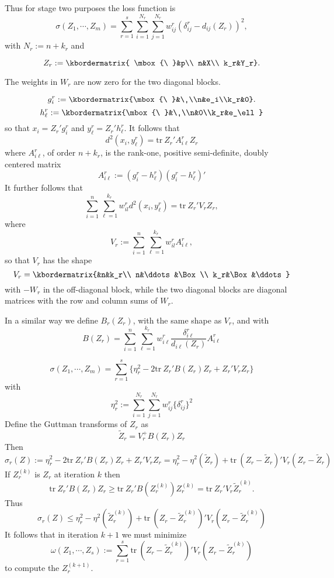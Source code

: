 \documentclass[
  12pt,
]{article}
\begin{document}
Thus for stage two purposes the loss function is
\[
\sigma(Z_1,\cdots,Z_m)=\sum_{r=1}^s\sum_{i=1}^{N_r}\sum_{j=1}^{N_r}w_{ij}^r(\delta_{ij}^r-d_{ij}(Z_r))^2,
\]
with \(N_r:=n+k_r\) and

\[
Z_r:=\kbordermatrix{
\mbox{\ }&p\\
n&X\\
k_r&Y_r}.
\]

The weights in \(W_r\) are now zero for the two diagonal blocks.

\[
g_i^r:=\kbordermatrix{\mbox{\ }&\ \\n&e_i\\k_r&0}.
\]
\[
h_\ell^r:=\kbordermatrix{\mbox{\ }&\ \\n&0\\k_r&e_\ell}
\]
so that \(x_i=Z_r'g_i^r\) and \(y_\ell^r=Z_r'h_\ell^r\). It follows that
\[
d^2(x_i,y_\ell^r)=\text{tr}\ Z_r'A^r_{i\ell}Z_r^{\ }
\]
where \(A_{i\ell}^r\), of order \(n+k_r\), is the rank-one, positive semi-definite, doubly centered matrix
\[
A_{i\ell}^r:=(g_i^r-h_\ell^r)(g_i^r-h_\ell^r)'
\]
It further follows that
\[
\sum_{i=1}^n\sum_{\ell=1}^{k_r}w_{il}^rd^2(x_i,y_\ell^r)=\text{tr}\ Z_r'V_rZ_r,
\]
where
\[
V_r:=\sum_{i=1}^n\sum_{\ell=1}^{k_r}w_{il}^rA^r_{i\ell},
\]
so that \(V_r\) has the shape
\[
V_r=\kbordermatrix{&n&k_r\\
n&\ddots&\Box\\
k_r&\Box&\ddots}
\]
with \(-W_r\) in the off-diagonal block, while the two diagonal
blocks are diagonal matrices with the row and column sums of \(W_r\).

In a similar way we define \(B_r(Z_r)\), with the same shape as \(V_r\), and with
\[
B(Z_r)=\sum_{i=1}^n\sum_{\ell=1}^{k_r}w_{i\ell}^r\frac{\delta_{i\ell}^r }{d_{i\ell}(Z_r)}A^r_{i\ell}
\]

\[
\sigma(Z_1,\cdots,Z_m)=\sum_{r=1}^s\{\eta_r^2-2\text{tr}\ Z_r'B(Z_r)Z_r+Z_r'V_rZ_r\}
\]
with
\[
\eta_r^2:=\sum_{i=1}^{N_r}\sum_{j=1}^{N_r}w_{ij}^r\{\delta_{ij}^r\}^2
\]
Define the Guttman transforms of \(Z_r\) as
\[
\tilde Z_r=V_r^+B(Z_r)Z_r
\]
Then
\[
\sigma_r(Z):=\eta_r^2-2\text{tr}\ Z_r'B(Z_r)Z_r+Z_r'V_rZ_r=\eta_r^2-\eta^2(\tilde Z_r)+\text{tr}\ (Z_r-\tilde Z_r)'V_r(Z_r-\tilde Z_r)
\]
If \(Z_r^{(k)}\) is \(Z_r\) at iteration \(k\) then
\[
\text{tr}\ Z_r'B(Z_r)Z_r\geq\text{tr}\ Z_r'B(Z_r^{(k)})Z_r^{(k)}=\text{tr}\ Z_r'V_r\tilde Z_r^{(k)}.
\]
Thus
\[
\sigma_r(Z)\leq\eta_r^2-\eta^2(\tilde Z_r^{(k)})+\text{tr}\ (Z_r-\tilde Z_r^{(k)})'V_r(Z_r-\tilde Z_r^{(k)})
\]
It follows that in iteration \(k+1\) we must minimize
\[
\omega(Z_1,\cdots,Z_s):=\sum_{r=1}^s\text{tr}\ (Z_r-\tilde Z_r^{(k)})'V_r(Z_r-\tilde Z_r^{(k)})
\]
to compute the \(Z_r^{(k+1)}\).
\end{document}

